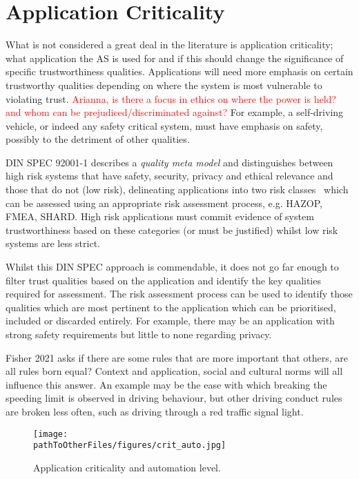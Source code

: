 \section{Application Criticality} \label{sec:appcrit}

What is not considered a great deal in the literature is application criticality; what application the AS is used for and if this should change the significance of specific trustworthiness qualities. Applications will need more emphasis on certain trustworthy qualities depending on where the system is most vulnerable to violating trust. 
%
\textcolor{red}{Arianna, is there a focus in ethics on where the power is held? and whom can be prejudiced/discriminated against?} 
%
For example, a self-driving vehicle, or indeed any safety critical system, must have emphasis on safety, possibly to the detriment of other qualities. 

DIN SPEC 92001-1 describes a \emph{quality meta model} and distinguishes between high risk systems that have safety, security, privacy and ethical relevance and those that do not (low risk), delineating applications into two risk classes~\cite{Englisch2019} which can be assessed using an appropriate risk assessment process, e.g. HAZOP, FMEA, SHARD. High risk applications must commit evidence of system trustworthiness based on these categories (or must be justified) whilst low risk systems are less strict.

Whilst this DIN SPEC approach is commendable, it does not go far enough to filter trust qualities based on the application and identify the key qualities required for assessment. The risk assessment process can be used to identify those qualities which are most pertinent to the application which can be prioritised, included or discarded entirely. For example, there may be an application with strong safety requirements but little to none regarding privacy. 

Fisher 2021 asks if there are some rules that are more important that others, are all rules born equal? Context and application, social and cultural norms will all influence this answer. An example may be the ease with which breaking the speeding limit is observed in driving behaviour, but other driving conduct rules are broken less often, such as driving through a red traffic signal light.

\begin{figure}[]
    \centering
    \texttt{[image: \\pathToOtherFiles/figures/crit\_auto.jpg]}
    \caption{Application criticality and automation level.}
    \label{fig:critauto}
\end{figure}


